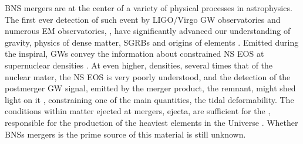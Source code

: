 %
%


\ac{BNS} mergers are at the center of a variety of physical processes in astrophysics.
The first ever detection of such event by \ac{LIGO}/Virgo \ac{GW} observatories and 
numerous \ac{EM} observatories, \GW{}, have significantly advanced our understanding 
of gravity, physics of dense matter, \acp{SGRB} and origins of \rproc{} elements 
\cite{TheLIGOScientific:2017qsa,Abbott:2018wiz,GBM:2017lvd}. 
%
Emitted during the inspiral, \acp{GW} convey the information about  
constrained \ac{NS} \ac{EOS} at supernuclear densities 
\citep{Hinderer:2009ca,Damour:2012yf,DelPozzo:2013ala}. At even higher, 
densities, several times that of the nuclear mater, the \ac{NS} \ac{EOS} is very 
poorly understood, and the detection of the postmerger \ac{GW} signal, 
emitted by the merger product, the remnant, might shed light on it 
\citep{Sekiguchi:2011mc,Radice:2017lry,Most:2018eaw,Bauswein:2018bma}, 
constraining one of the main quantities, the tidal deformability.
%
The conditions within matter ejected at mergers, ejecta, are sufficient for the \rproc{} 
\nuc{}, responsible for the production of the heaviest elements in the Universe
\citep{Cowan:2019pkx}.
Whether \acp{BNS} mergers is the prime source of this material is still unknown.

